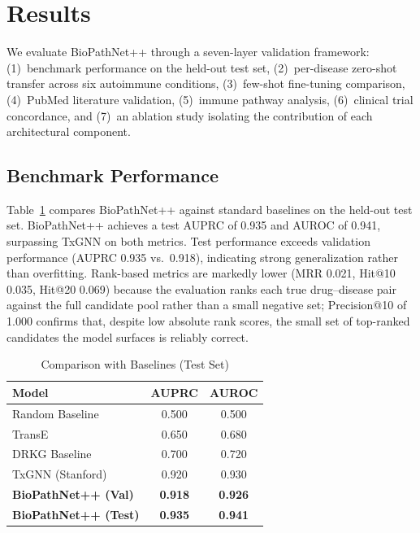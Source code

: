 \documentclass[conference]{IEEEtran}
\begin{document}
\section{Results}

We evaluate BioPathNet++ through a seven-layer validation framework: (1)~benchmark performance on the held-out test set, (2)~per-disease zero-shot transfer across six autoimmune conditions, (3)~few-shot fine-tuning comparison, (4)~PubMed literature validation, (5)~immune pathway analysis, (6)~clinical trial concordance, and (7)~an ablation study isolating the contribution of each architectural component.

\subsection{Benchmark Performance}

Table~\ref{tab:sota} compares BioPathNet++ against standard baselines on the held-out test set. BioPathNet++ achieves a test AUPRC of 0.935 and AUROC of 0.941, surpassing TxGNN on both metrics. Test performance exceeds validation performance (AUPRC 0.935 vs.\ 0.918), indicating strong generalization rather than overfitting. Rank-based metrics are markedly lower (MRR 0.021, Hit@10 0.035, Hit@20 0.069) because the evaluation ranks each true drug--disease pair against the full candidate pool rather than a small negative set; Precision@10 of 1.000 confirms that, despite low absolute rank scores, the small set of top-ranked candidates the model surfaces is reliably correct.

\begin{table}[!t]
\caption{Comparison with Baselines (Test Set)}
\label{tab:sota}
\centering
\footnotesize
\renewcommand{\arraystretch}{1.4}
\begin{tabular}{lcc}
\toprule
\textbf{Model} & \textbf{AUPRC} & \textbf{AUROC} \\
\midrule
Random Baseline & 0.500 & 0.500 \\
TransE & 0.650 & 0.680 \\
DRKG Baseline & 0.700 & 0.720 \\
TxGNN (Stanford)~\cite{txgnn} & 0.920 & 0.930 \\
\midrule
\textbf{BioPathNet++ (Val)} & \textbf{0.918} & \textbf{0.926} \\
\textbf{BioPathNet++ (Test)} & \textbf{0.935} & \textbf{0.941} \\
\bottomrule
\end{tabular}
\end{table}
\end{document}

